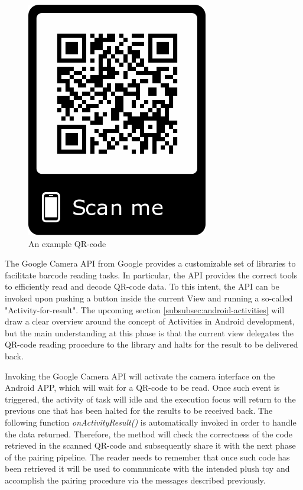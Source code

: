 \begin{figure}[ht]
    \centering
    \includegraphics[scale=0.4]{images/frame.png}
    \caption{An example QR-code}
    \label{fig:SE_qrcode}
\end{figure}

\medskip
The Google Camera API from Google \cite{barcodeAPItutorial} provides a customizable set of libraries to facilitate barcode reading tasks. In particular, the API provides the correct tools to efficiently read and decode QR-code data. To this intent, the API can be invoked upon pushing a button inside the current View and running a so-called "Activity-for-result". The upcoming section \ref{subsubsec:android-activities} will draw a clear overview around the concept of Activities in Android development, but the main understanding at this phase is that the current view delegates the QR-code reading procedure to the library and halts for the result to be delivered back.

\vspace{0.5cm}

\vspace{0.5cm}

Invoking the Google Camera API will activate the camera interface on the Android APP, which will wait for a QR-code to be read. Once such event is triggered, the activity of task will idle and the execution focus will return to the previous one that has been halted for the results to be received back. The following function \textit{onActivityResult()} is automatically invoked in order to handle the data returned. Therefore, the method will check the correctness of the code retrieved in the scanned QR-code and subsequently share it with the next phase of the pairing pipeline. The reader needs to remember that once such code has been retrieved it will be used to communicate with the intended plush toy and accomplish the pairing procedure via the messages described previously.

